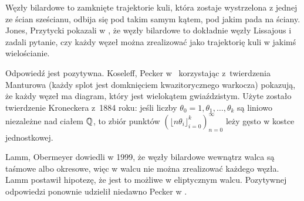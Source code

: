 Węzły bilardowe to zamknięte trajektorie kuli, która zostaje wystrzelona z jednej ze ścian sześcianu, odbija się pod takim samym kątem, pod jakim pada na ściany.
Jones, Przytycki pokazali w \cite{jones98}, że węzły bilardowe to dokładnie węzły Lissajous i zadali pytanie, czy każdy węzeł można zrealizować jako trajektorię kuli w jakimś wielościanie.

Odpowiedź jest pozytywna.
Koseleff, Pecker w~\cite{koseleff14} korzystając z~twierdzenia Manturowa 
(każdy splot jest domknięciem kwazitorycznego warkocza)
pokazują, że każdy węzeł ma diagram, który jest wielokątem gwiaździstym.
Użyte zostało twierdzenie Kroneckera z~1884 roku: jeśli liczby $\theta_0 = 1, \theta_1, \ldots, \theta_k$ są liniowo niezależne nad ciałem $\mathbb Q$, to zbiór punktów $(\lfloor n\theta_i \rfloor_{i=0}^k)_{n=0}^\infty$ leży gęsto w kostce jednostkowej.

Lamm, Obermeyer dowiedli w 1999, że węzły bilardowe wewnątrz walca są taśmowe albo okresowe, więc w walcu nie można zrealizować każdego węzła.
Lamm postawił hipotezę, że jest to możliwe w eliptycznym walcu.
Pozytywnej odpowiedzi ponownie udzielił niedawno Pecker w \cite{pecker12}.

